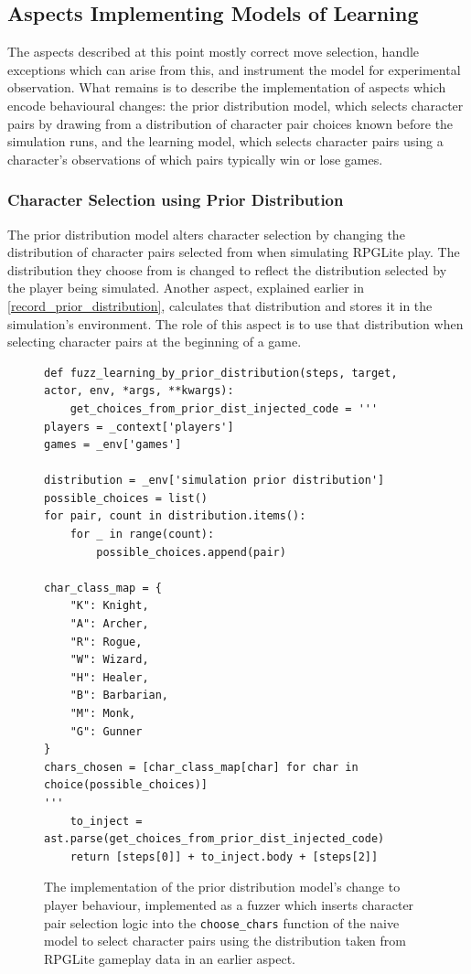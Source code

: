 \subsection{Aspects Implementing Models of Learning}\label{subsec:aspects_modelling_learning}


The aspects described at this point mostly correct move selection, handle
exceptions which can arise from this, and instrument the model for experimental
observation. What remains is to describe the implementation of aspects which
encode behavioural changes: the prior distribution model, which selects
character pairs by drawing from a distribution of character pair choices known
before the simulation runs, and the learning model, which selects character
pairs using a character's observations of which pairs typically win or lose
games. 


\subsubsection{Character Selection using Prior Distribution}
\label{prior_distribution_aspect_description}

The prior distribution model alters character selection by changing the
distribution of character pairs selected from when simulating RPGLite play. The
distribution they choose from is changed to reflect the distribution selected by
the player being simulated. Another aspect, explained earlier in
\cref{record_prior_distribution}, calculates that distribution and stores it in
the simulation's environment. The role of this aspect is to use that
distribution when selecting character pairs at the beginning of a game.

\begin{figure}
  \centering
  \begin{lstlisting}[style=footnotesize_python]
def fuzz_learning_by_prior_distribution(steps, target, actor, env, *args, **kwargs):
    get_choices_from_prior_dist_injected_code = '''
players = _context['players']
games = _env['games']

distribution = _env['simulation prior distribution']
possible_choices = list()
for pair, count in distribution.items():
    for _ in range(count):
        possible_choices.append(pair)

char_class_map = {
    "K": Knight,
    "A": Archer,
    "R": Rogue,
    "W": Wizard,
    "H": Healer,
    "B": Barbarian,
    "M": Monk,
    "G": Gunner
}
chars_chosen = [char_class_map[char] for char in choice(possible_choices)]
'''
    to_inject = ast.parse(get_choices_from_prior_dist_injected_code)
    return [steps[0]] + to_inject.body + [steps[2]]
  \end{lstlisting}
  \caption{The implementation of the prior distribution model's change to player
  behaviour, implemented as a \pdsf{} fuzzer which inserts character pair
  selection logic into the \lstinline{choose_chars} function of the naive model
  to select character pairs using the distribution taken from RPGLite gameplay
  data in an earlier aspect.}
  \label{fig:prior_distribution_implementation}
\end{figure}



